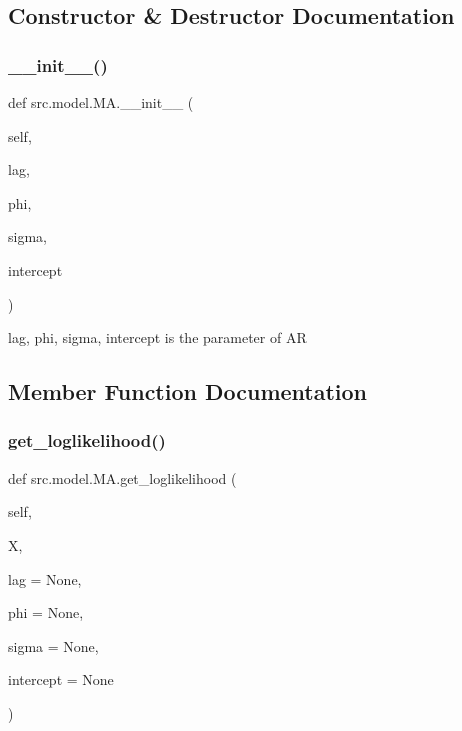 \subsection{Constructor \& Destructor Documentation}
\mbox{\label{classsrc_1_1model_1_1MA_a6a4df2f2b129069362819f597a1fc672}} 
\subsubsection{\texorpdfstring{\+\_\+\+\_\+init\+\_\+\+\_\+()}{\_\_init\_\_()}}
{\footnotesize\ttfamily def src.\+model.\+M\+A.\+\_\+\+\_\+init\+\_\+\+\_\+ (\begin{DoxyParamCaption}\item[{}]{self,  }\item[{}]{lag,  }\item[{}]{phi,  }\item[{}]{sigma,  }\item[{}]{intercept }\end{DoxyParamCaption})}

\begin{DoxyVerb}lag, phi, sigma, intercept is the parameter of AR\end{DoxyVerb}
 

\subsection{Member Function Documentation}
\mbox{\label{classsrc_1_1model_1_1MA_ac4f9c0e95e6a26447797a9e82144311c}} 
\subsubsection{\texorpdfstring{get\+\_\+loglikelihood()}{get\_loglikelihood()}}
{\footnotesize\ttfamily def src.\+model.\+M\+A.\+get\+\_\+loglikelihood (\begin{DoxyParamCaption}\item[{}]{self,  }\item[{}]{X,  }\item[{}]{lag = {\ttfamily None},  }\item[{}]{phi = {\ttfamily None},  }\item[{}]{sigma = {\ttfamily None},  }\item[{}]{intercept = {\ttfamily None} }\end{DoxyParamCaption})}

